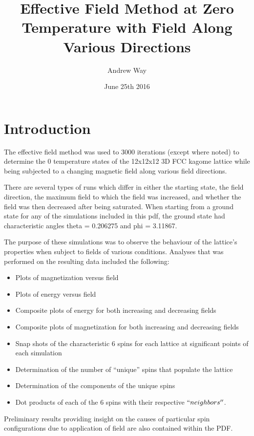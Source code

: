 \documentclass{article}
\title{Effective Field Method at Zero Temperature with Field Along Various Directions}
\author{Andrew Way}
\date{June 25th 2016}
\begin{document}
\maketitle

\tableofcontents

\clearpage
\section{Introduction}
    The effective field method was used to 3000 iterations (except where noted) to determine the 0 temperature states of 
    the 12x12x12 3D FCC kagome lattice while being subjected to a changing magnetic field along various field
    directions. 
    
    There are several types of runs which differ in either the starting state, the field direction, the maximum field
    to which the field was increased, and whether the field was then decreased after being saturated. When starting from a 
    ground state for any of the simulations included in this pdf, the ground state had characteristic angles theta = 0.206275 and phi = 3.11867.
    
    The purpose of these simulations was to observe the behaviour of the lattice's properties when subject to fields
    of various conditions.
    Analyses that was performed on the resulting data included the following:
    \begin{itemize}
     \item Plots of magnetization versus field
     \item Plots of energy versus field
     \item Composite plots of energy for both increasing and decreasing fields
     \item Composite plots of magnetization for both increasing and decreasing fields
     \item Snap shots of the characteristic 6 spins for each lattice at significant points of each simulation
     \item Determination of the number of ``unique'' spins that populate the lattice 
     \item Determination of the components of the unique spins
     \item Dot products of each of the 6 spins with their respective $``neighbors''$.  
    \end{itemize}
    
    Preliminary results providing insight on the causes of particular spin configurations due to application of field are also
    contained within the PDF. 
    
\end{document}
